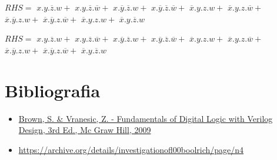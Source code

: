 {\begin{tiny}
\pause

$RHS = $
$x.y.\overline{z}.w+$
$x.y.\overline{z}.\overline{w}+$
$x.\overline{y}.\overline{z}.w+$
$x.\overline{y}.\overline{z}.\overline{w}+$
$\overline{x}.y.z.w+$   
$\overline{x}.y.z.\overline{w}+$
$\overline{x}.\overline{y}.z.w+$
$\overline{x}.\overline{y}.z.\overline{w}+$
$\overline{x}.y.z.w+$
$\overline{x}.y.\overline{z}.w$

\pause

$RHS = $
$x.y.\overline{z}.w+$
$x.y.\overline{z}.\overline{w}+$
$x.\overline{y}.\overline{z}.w+$
$x.\overline{y}.\overline{z}.\overline{w}+$
$\overline{x}.y.z.w+$
$\overline{x}.y.z.\overline{w}+$
$\overline{x}.\overline{y}.z.w+$
$\overline{x}.\overline{y}.z.\overline{w}+$
$\overline{x}.y.\overline{z}.w$

\end{tiny}
}

\section{Bibliografia} %

\begin{frame}{\insertsection} 
	\begin{itemize}
		\item \href{https://www.google.com.br/search?q=filetype\%3Apdf+Fundamentals+of+Digital+Logic+with+Verilog+Design+&oq=filetype\%3Apdf}{Brown, S. \& Vranesic, Z. - Fundamentals of Digital Logic with Verilog Design, 3rd Ed., Mc Graw Hill, 2009}
		\item \href{https://archive.org/details/investigationofl00boolrich/page/n4}{https://archive.org/details/investigationofl00boolrich/page/n4}
	\end{itemize}
\end{frame}

\begin{frame}
	\titlepage
\end{frame} 

